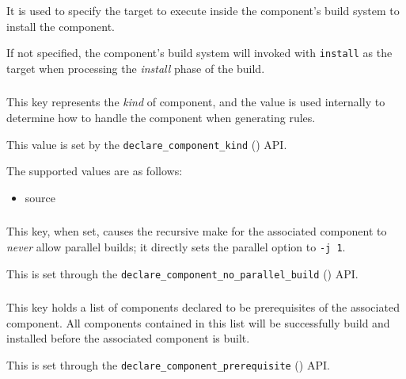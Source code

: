 It is used to specify the target to execute inside the component's
build system to install the component.

If not specified, the component's build system will invoked with
\texttt{install} as the target when processing the \emph{install}
phase of the build.

\subsubsection{}

This key represents the \emph{kind} of component, and the value is
used internally to determine how to handle the component when
generating rules.

This value is set by the \texttt{declare\_component\_kind}
() API.

The supported values are as follows:

\begin{itemize}
\item source
\end{itemize}

\subsubsection{}

This key, when set, causes the recursive make for the associated
component to \emph{never} allow parallel builds; it directly sets the
\gnumake parallel option to \texttt{-j 1}.

This is set through the
\texttt{declare\_component\_no\_parallel\_build}
() API.


\subsubsection{}

This key holds a list of components declared to be prerequisites of
the associated component.  All components contained in this list will
be successfully build and installed before the associated component is
built.

This is set through the \texttt{declare\_component\_prerequisite}
() API.

\subsubsection{}

